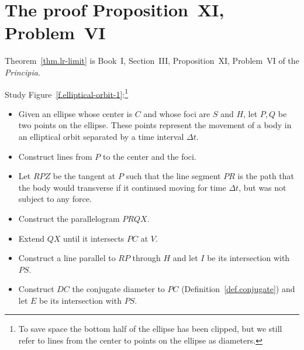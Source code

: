 

\section{The proof Proposition~XI, Problem~VI}
\label{s.centripetal}

Theorem~\ref{thm.lr-limit} is Book~I, Section~III, Proposition~XI, Problem~VI of the \emph{Principia}.

Study Figure~\ref{f.elliptical-orbit-1}:\footnote{To save space the bottom half of the ellipse has been clipped, but we still refer to lines from the center to points on the ellipse as diameters.}
\begin{itemize}
\item  Given an ellipse whose center is $C$ and whose foci are $S$ and $H$, let $P,Q$ be two points on the ellipse. These points represent the movement of a body in an elliptical orbit separated by a time interval $\Delta t$.

\item Construct lines from $P$ to the center and the foci. 

\item Let $RPZ$ be the tangent at $P$ such that the line segment $PR$ is the path that the body would transverse if it continued moving for time $\Delta t$, but was not subject to any force.

\item Construct the parallelogram $PRQX$.

\item Extend $QX$ until it intersects $PC$ at $V$.

\item Construct a line parallel to $RP$ through $H$ and let $I$ be its intersection with $PS$. 

\item Construct $DC$ the conjugate diameter to $PC$ (Definition~\ref{def.conjugate}) and let $E$ be its intersection with $PS$.
\end{itemize}


